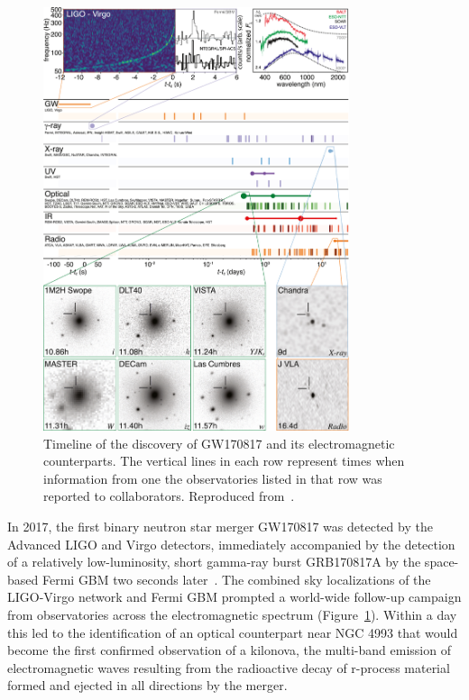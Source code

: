 \begin{figure}
	\centering
	\includegraphics[width=0.8\textwidth]{figures/gw/gw170817.jpg}
	\caption[Timeline of the discovery of GW170817 and its electromagnetic counterparts.]{Timeline of the discovery of GW170817 and its electromagnetic counterparts. The vertical lines in each row represent times when information from one the observatories listed in that row was reported to collaborators. Reproduced from~\citet{gw170817_mma}.}
	\label{fig:mma-gw170817}
\end{figure}

In 2017, the first binary neutron star merger GW170817 was detected by the Advanced LIGO and Virgo detectors, immediately accompanied by the detection of a relatively low-luminosity, short gamma-ray burst GRB170817A by the space-based Fermi \ac{GBM} two seconds later~\citep{gw170817}.
The combined sky localizations of the LIGO-Virgo network and Fermi GBM prompted a world-wide follow-up campaign from observatories across the electromagnetic spectrum (Figure~\ref{fig:mma-gw170817}).
Within a day this led to the identification of an optical counterpart near NGC 4993 that would become the first confirmed observation of a kilonova, the multi-band emission of electromagnetic waves resulting from the radioactive decay of r-process material formed and ejected in all directions by the merger.

